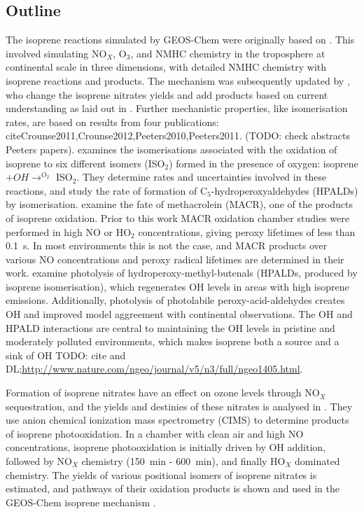   \subsection{Outline}
    The isoprene reactions simulated by GEOS-Chem were originally based on \cite{Horowitz1998}.
    This involved simulating NO$_X$, O$_3$, and NMHC chemistry in the troposphere at continental scale in three dimensions, with detailed NMHC chemistry with isoprene reactions and products.
    The mechanism was subsequently updated by \citet{Mao2013}, who change the isoprene nitrates yields and add products based on current understanding as laid out in \citet{Paulot2009a,Paulot2009b}.
    Further mechanistic properties, like isomerisation rates, are based on results from four publications: cite{Crounse2011,Crounse2012,Peeters2010,Peeters2011}.
    (TODO: check abstracts Peeters papers).
    \cite{Crounse2011} examines the isomerisations associated with the oxidation of isoprene to six different isomers (ISO$_2$) formed in the presence of oxygen: isoprene $ + OH \rightarrow^{O_2} $ ISO$_2$.
    They determine rates and uncertainties involved in these reactions, and study the rate of formation of C$_5$-hydroperoxyaldehydes (HPALDs) by isomerisation.
    \cite{Crounse2012} examine the fate of methacrolein (MACR), one of the products of isoprene oxidation. 
    Prior to this work MACR oxidation chamber studies were performed in high NO or HO$_2$ concentrations, giving peroxy lifetimes of less than 0.1~s.
    In most environments this is not the case, and MACR products over various NO concentrations and peroxy radical lifetimes are determined in their work.
    \cite{Peeters2010} examine photolysis of hydroperoxy-methyl-butenals (HPALDs, produced by isoprene isomerisation), which regenerates OH levels in areas with high isoprene emissions.
    Additionally, photolysis of photolabile peroxy-acid-aldehydes creates OH and improved model aggreement with continental observations.
    The OH and HPALD interactions are central to maintaining the OH levels in pristine and moderately polluted environments, which makes isoprene both a source and a sink of OH TODO: cite and DL;\url{http://www.nature.com/ngeo/journal/v5/n3/full/ngeo1405.html}.
    
    Formation of isoprene nitrates have an effect on ozone levels through NO$_X$ sequestration, and the yields and destinies of these nitrates is analysed in \citet{Paulot2009a}. 
    They use anion chemical ionization mass spectrometry (CIMS) to determine products of isoprene photooxidation.
    In a chamber with clean air and high NO concentrations, isoprene photooxidation is initially driven by OH addition, followed by NO$_X$ chemistry (150~min - 600~min), and finally HO$_X$ dominated chemistry.
    The yields of various positional isomers of isoprene nitrates is estimated, and pathways of their oxidation products is shown and used in the GEOS-Chem isoprene mechanism \citep{Paulot2009a,Mao2013}. 
    
